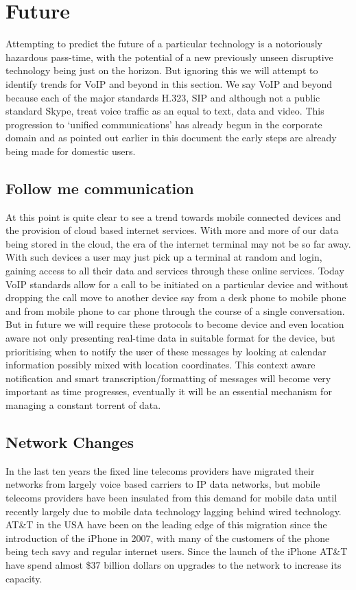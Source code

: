 \section{Future}

Attempting to predict the future of a particular technology is a notoriously hazardous pass-time, with the potential of a new previously unseen disruptive technology being just on the horizon. But ignoring this we will attempt to identify trends for VoIP and beyond in this section. We say VoIP and beyond because each of the major standards H.323, SIP and although not a public standard Skype, treat voice traffic as an equal to text, data and video. This progression to ‘unified communications’ has already begun in the corporate domain and as pointed out earlier in this document the early steps are already being made for domestic users.

\subsection{Follow me communication}
At this point is quite clear to see a trend towards mobile connected devices and the provision of cloud based internet services. With more and more of our data being stored in the cloud, the era of the internet terminal may not be so far away. With such devices a user may just pick up a terminal at random and login, gaining access to all their data and services through these online services.
Today VoIP standards allow for a call to be initiated on a particular device and without dropping the call move to another device say from a desk phone to mobile phone and from mobile phone to car phone through the course of a single conversation. But in future we will require these protocols to become device and even location aware not only presenting real-time data in suitable format for the device, but prioritising when to notify the user of these messages by looking at calendar information possibly mixed with location coordinates.
This context aware notification and smart transcription/formatting of messages will become very important as time progresses, eventually it will be an essential mechanism for managing a constant torrent of data.

\subsection{Network Changes}
In the last ten years the fixed line telecoms providers have migrated their networks from largely voice based carriers to IP data networks, but mobile telecoms providers have been insulated from this demand for mobile data until recently largely due to mobile data technology lagging behind wired technology. AT\&T in the USA have been on the leading edge of this migration since the introduction of the iPhone in 2007, with many of the customers of the phone being tech savy and regular internet users. Since the launch of the iPhone AT\&T have spend almost \$37 billion dollars on upgrades to the network to increase its capacity.

